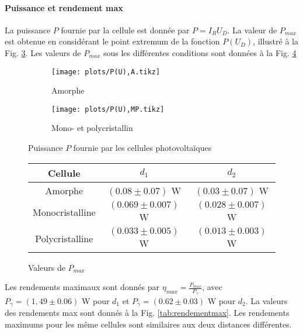 \paragraph*{Puissance et rendement max}
La puissance \(P\) fournie par la cellule est donnée par \(P = I_R U_D\). La valeur de \(P_{max}\) est obtenue en considérant le point extremum de la fonction \(P(U_D)\), illustré à la Fig. \ref{plot:3}. Les valeurs de \(P_{max}\) sous les différentes conditions sont données à la Fig. \ref{tab:pmax}

\begin{figure}[h]
    \centering
    \begin{subfigure}[c]{0.45\linewidth}
        \centering
        \texttt{[image: plots/P(U),A.tikz]}
        \caption{Amorphe}
        \label{plot:3a}        
    \end{subfigure}
    \begin{subfigure}[c]{0.45\linewidth}
        \centering
        \texttt{[image: plots/P(U),MP.tikz]}
        \caption{Mono- et polycristallin}
        \label{plot:3b}        
    \end{subfigure}
    \caption{Puissance \(P\) fournie par les cellules photovoltaïques}
    \label{plot:3}
\end{figure}

\begin{figure}[h]
    \centering
    \begin{tabulary}{0.7\linewidth}{C C C}
        \toprule
        Cellule & \(d_1\) & \(d_2\) \\
        \midrule
        Amorphe & \((0.08 \pm 0.07)\) \unit{\watt} & \((0.03 \pm 0.07)\) \unit{\watt} \\
        Monocristalline & \((0.069 \pm 0.007)\) \unit{\watt} & \((0.028 \pm 0.007)\) \unit{\watt} \\
        Polycristalline & \((0.033 \pm 0.005)\) \unit{\watt} & \((0.013 \pm 0.003)\) \unit{\watt} \\
        \bottomrule
    \end{tabulary}
    \caption{Valeurs de \(P_{max}\)}
    \label{tab:pmax}
\end{figure}

Les rendements maximaux sont donnés par \(\eta_{max} = \frac{P_{max}}{P_\gamma}\), avec \(P_\gamma = (1,49 \pm 0.06)\) \unit{\watt} pour \(d_1\) et \(P_\gamma = (0.62 \pm 0.03)\) \unit{\watt} pour \(d_2\). La valeurs des rendements max sont donnés à la Fig. \ref{tab:rendementmax}. Les rendements maximums pour les même cellules sont similaires aux deux distances différentes. 


